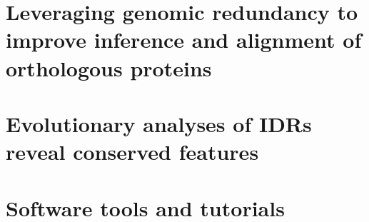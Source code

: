 \documentclass[11pt,letterpaper,oneside]{book}
\begin{document}
\chapter{Leveraging genomic redundancy to improve inference and alignment of orthologous proteins}
\graphicspath{{chapter1/figures/}}

\clearpage
\setcounter{figure}{0}
\renewcommand{\thefigure}{S\arabic{figure}}

\renewcommand{\thefigure}{\arabic{chapter}.\arabic{figure}}

\chapter{Evolutionary analyses of IDRs reveal conserved features}

\lipsum[6-8]

\chapter{Software tools and tutorials}

\lipsum[9-10]

\printbibliography[heading=bibintoc]
\end{document}
